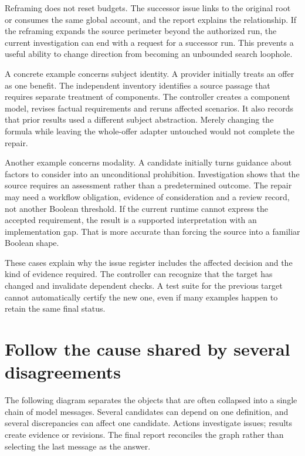 Reframing does not reset budgets. The successor issue links to the original root
or consumes the same global account, and the report explains the relationship.
If the reframing expands the source perimeter beyond the authorized run, the
current investigation can end with a request for a successor run. This prevents a
useful ability to change direction from becoming an unbounded search loophole.


A concrete example concerns subject identity. A provider initially treats an
offer as one benefit. The independent inventory identifies a source passage that
requires separate treatment of components. The controller creates a component
model, revises factual requirements and reruns affected scenarios. It also records
that prior results used a different subject abstraction. Merely changing the
formula while leaving the whole-offer adapter untouched would not complete the
repair.

Another example concerns modality. A candidate initially turns guidance about
factors to consider into an unconditional prohibition. Investigation shows that
the source requires an assessment rather than a predetermined outcome. The repair
may need a workflow obligation, evidence of consideration and a review record,
not another Boolean threshold. If the current runtime cannot express the accepted
requirement, the result is a supported interpretation with an implementation gap.
That is more accurate than forcing the source into a familiar Boolean shape.

These cases explain why the issue register includes the affected decision and the
kind of evidence required. The controller can recognize that the target has
changed and invalidate dependent checks. A test suite for the previous target
cannot automatically certify the new one, even if many examples happen to retain
the same final status.

\section{Follow the cause shared by several disagreements}
\label{merge:M06:11}


The following diagram separates the objects that are often collapsed into a
single chain of model messages. Several candidates can depend on one definition,
and several discrepancies can affect one candidate. Actions investigate issues;
results create evidence or revisions. The final report reconciles the graph rather
than selecting the last message as the answer.

